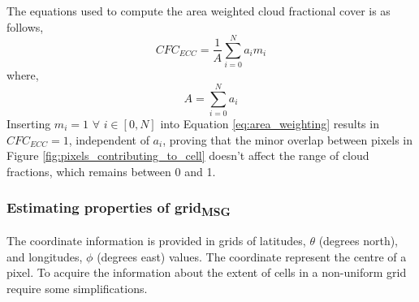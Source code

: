The equations used to compute the area weighted cloud fractional cover is as follows,
\begin{equation} \label{eq:area_weighting}
    CFC_{ECC} = \frac{1}{A} \sum_{i=0}^{N} a_i m_i
\end{equation}
where,
\begin{equation} \label{eq:tot_area}
    A = \sum_{i=0}^{N} a_i
\end{equation}
Inserting $m_i = 1$ $\forall$ $i \in [0,N]$ into Equation \eqref{eq:area_weighting} results in $CFC_{ECC}=1$, independent of $a_i$, proving that the minor overlap between pixels in Figure \ref{fig:pixels_contributing_to_cell} doesn't affect the range of cloud fractions, which remains between 0 and 1.

\subsubsection{Estimating properties of grid\textsubscript{MSG}}
The coordinate information is provided in grids of latitudes, $\theta$ (degrees north), and longitudes, $\phi$ (degrees east) values. The coordinate represent the centre of a pixel. To acquire the information about the extent of cells in a non-uniform grid require some simplifications. 

